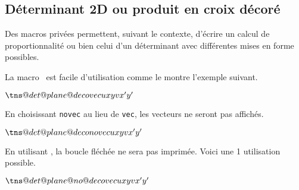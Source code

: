 \documentclass[12pt,a4paper]{article}
\begin{document}

\subsection{Déterminant 2D ou produit en croix décoré}

Des macros privées permettent, suivant le contexte, d'écrire un calcul de proportionnalité ou bien celui d'un déterminant avec différentes mises en forme possibles.



La macro  est facile d'utilisation comme le montre l'exemple suivant.

\begin{latexex}
\makeatletter
$\tns@det@plane@deco%
     {vec}     %
     {u}       %
     {x}{y}    %
     {v}       %
     {x'}{y'}$ %
\makeatother
\end{latexex}





En choisissant \verb+novec+ au lieu de \verb+vec+, les vecteurs ne seront pas affichés.

\begin{latexex}
\makeatletter
$\tns@det@plane@deco{novec}   %
                    {u}{x}{y} %
                    {v}{x'}{y'}$
\makeatother
\end{latexex}





En utilisant , la boucle fléchée ne sera pas imprimée. Voici une 1\iere{} utilisation possible.

\begin{latexex}
\makeatletter
$\tns@det@plane@no@deco{vec}     %
                       {u}{x}{y} %
                       {v}{x'}{y'}$
\makeatother
\end{latexex}





\end{document}
